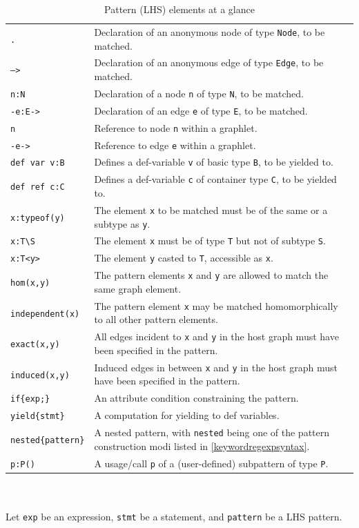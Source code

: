 \begin{table}[htbp]
\begin{minipage}{\linewidth} \renewcommand{\footnoterule}{} 
\begin{tabularx}{\linewidth}{|lX|}
\hline
\texttt{.}	& Declaration of an anonymous node of type \texttt{Node}, to be matched. \\
\texttt{-->}	& Declaration of an anonymous edge of type \texttt{Edge}, to be matched. \\
\texttt{n:N} & Declaration of a node \texttt{n} of type \texttt{N}, to be matched.\\
\texttt{-e:E->} & Declaration of an edge \texttt{e} of type \texttt{E}, to be matched.\\
\texttt{n} & Reference to node \texttt{n} within a graphlet.\\
\texttt{-e->} & Reference to edge \texttt{e} within a graphlet.\\
\texttt{def var v:B}	& Defines a def-variable \texttt{v} of basic type \texttt{B}, to be yielded to.\\
\texttt{def ref c:C}	& Defines a def-variable \texttt{c} of container type \texttt{C}, to be yielded to.\\
\hline
\texttt{x:typeof(y)} & The element \texttt{x} to be matched must be of the same or a subtype as \texttt{y}.\\
\texttt{x:T{\textbackslash}S} & The element \texttt{x} must be of type \texttt{T} but not of subtype \texttt{S}.\\
\texttt{x:T<y>} & The element \texttt{y} casted to \texttt{T}, accessible as \texttt{x}.\\
\hline
\texttt{hom(x,y)} & The pattern elements \texttt{x} and \texttt{y} are allowed to match the same graph element.\\
\texttt{independent(x)} & The pattern element \texttt{x} may be matched homomorphically to all other pattern elements.\\
\texttt{exact(x,y)} & All edges incident to \texttt{x} and \texttt{y} in the host graph must have been specified in the pattern.\\
\texttt{induced(x,y)} & Induced edges in between \texttt{x} and \texttt{y} in the host graph must have been specified in the pattern.\\
\hline
\texttt{if\{exp;\}} & An attribute condition constraining the pattern.\\
\texttt{yield\{stmt\}} & A computation for yielding to def variables.\\
\hline
\texttt{nested\{pattern\}} & A nested pattern, with \texttt{nested} being one of the pattern construction modi listed in \ref{keywordregexpsyntax}.\\
\hline
\texttt{p:P()} & A usage/call \texttt{p} of a (user-defined) subpattern of type \texttt{P}.\\
\hline
\end{tabularx}
\end{minipage}\\
\\ 
{\small Let \texttt{exp} be an expression, \texttt{stmt} be a statement, and \texttt{pattern} be a LHS pattern.}
\caption{Pattern (LHS) elements at a glance}
\label{patternstab}
\end{table}
